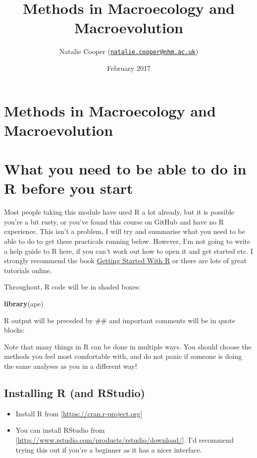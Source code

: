 \documentclass[]{book}
\title{Methods in Macroecology and Macroevolution}
\author{Natalie Cooper
(\href{mailto:natalie.cooper@nhm.ac.uk}{\nolinkurl{natalie.cooper@nhm.ac.uk}})}
\date{February 2017}
\newenvironment{Shaded}{\begin{snugshade}}{\end{snugshade}}
\newcommand{\KeywordTok}[1]{\textcolor[rgb]{0.13,0.29,0.53}{\textbf{{#1}}}}
\newcommand{\NormalTok}[1]{{#1}}
\providecommand{\tightlist}{%
  \setlength{\itemsep}{0pt}\setlength{\parskip}{0pt}}
\begin{document}
\maketitle

{
\setcounter{tocdepth}{1}
\tableofcontents
}
\chapter{Methods in Macroecology and
Macroevolution}\label{methods-in-macroecology-and-macroevolution}

\chapter{What you need to be able to do in R before you
start}\label{what-you-need-to-be-able-to-do-in-r-before-you-start}

Most people taking this module have used R a lot already, but it is
possible you're a bit rusty, or you've found this course on GitHub and
have no R experience. This isn't a problem, I will try and summarise
what you need to be able to do to get these practicals running below.
However, I'm not going to write a help guide to R here, if you can't
work out how to open it and get started etc. I strongly recommend the
book \href{http://www.r4all.org/}{Getting Started With R} or there are
lots of great tutorials online.

Throughout, R code will be in shaded boxes:

\begin{Shaded}
\begin{Highlighting}[]
\KeywordTok{library}\NormalTok{(ape)}
\end{Highlighting}
\end{Shaded}

R output will be preceded by \#\# and important comments will be in
quote blocks:

Note that many things in R can be done in multiple ways. You should
choose the methods you feel most comfortable with, and do not panic if
someone is doing the same analyses as you in a different way!

\section{Installing R (and RStudio)}\label{installing-r-and-rstudio}

\begin{itemize}
\tightlist
\item
  Install R from {[}\url{https://cran.r-project.org}{]}
\item
  You can install RStudio from
  {[}\url{http://www.rstudio.com/products/rstudio/download/}{]}. I'd
  recommend trying this out if you're a beginner as it has a nicer
  interface.
\end{itemize}
\end{document}

